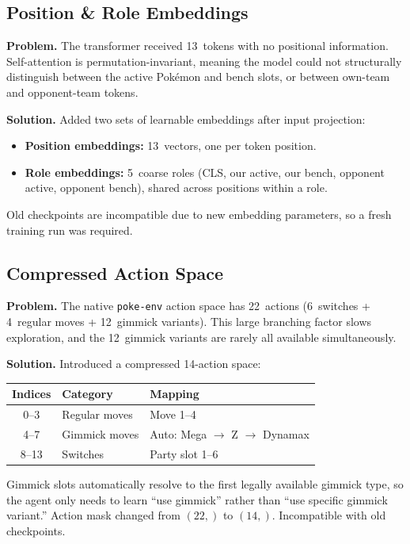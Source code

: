 \subsection{Position \& Role Embeddings}

\textbf{Problem.} The transformer received 13~tokens with no positional
information.  Self-attention is permutation-invariant, meaning the model
could not structurally distinguish between the active Pok\'{e}mon and bench
slots, or between own-team and opponent-team tokens.

\textbf{Solution.} Added two sets of learnable embeddings after input
projection:
\begin{itemize}
  \item \textbf{Position embeddings:} 13~vectors, one per token position.
  \item \textbf{Role embeddings:} 5~coarse roles (CLS, our active, our bench,
        opponent active, opponent bench), shared across positions within a role.
\end{itemize}

Old checkpoints are incompatible due to new embedding parameters, so a fresh
training run was required.

\subsection{Compressed Action Space}

\textbf{Problem.} The native \texttt{poke-env} action space has 22~actions
(6~switches + 4~regular moves + 12~gimmick variants).  This large branching
factor slows exploration, and the 12~gimmick variants are rarely all available
simultaneously.

\textbf{Solution.} Introduced a compressed 14-action space:

\begin{center}
\small
\begin{tabularx}{0.7\textwidth}{c l l}
  \toprule
  \textbf{Indices} & \textbf{Category} & \textbf{Mapping} \\
  \midrule
  0--3  & Regular moves & Move 1--4 \\
  4--7  & Gimmick moves & Auto: Mega $\to$ Z $\to$ Dynamax \\
  8--13 & Switches      & Party slot 1--6 \\
  \bottomrule
\end{tabularx}
\end{center}

Gimmick slots automatically resolve to the first legally available gimmick
type, so the agent only needs to learn ``use gimmick'' rather than ``use
specific gimmick variant.''  Action mask changed from $(22,)$ to $(14,)$.
Incompatible with old checkpoints.

